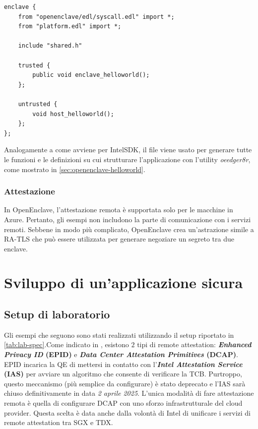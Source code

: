\documentclass{article}
\begin{document}
\begin{lstlisting}[caption=Esempio base di un file EDL,label=lst:base-edl]
enclave {
    from "openenclave/edl/syscall.edl" import *;
    from "platform.edl" import *;
     
    include "shared.h"

    trusted {
        public void enclave_helloworld();
    };

    untrusted {
        void host_helloworld();
    };
};
\end{lstlisting}

Analogamente a come avviene per IntelSDK, il file viene usato per generare tutte le funzioni e le definizioni su cui strutturare l'applicazione con l'utility \textit{oeedger8r}, come mostrato in \cref{sec:openenclave-helloworld}.

\subsubsection{Attestazione}
In OpenEnclave, l'attestazione remota è supportata solo per le macchine in Azure. Pertanto, gli esempi non includono la parte di comunicazione con i servizi remoti. Sebbene in modo più complicato, OpenEnclave crea un'astrazione simile a RA-TLS che può essere utilizzata per generare negoziare un segreto tra due enclave.

\clearpage
\section{Sviluppo di un'applicazione sicura}
\subsection{Setup di laboratorio}
Gli esempi che seguono sono stati realizzati utilizzando il setup riportato in \cref{tab:lab-spec}.Come indicato in , esistono $2$ tipi di remote attestation: \textbf{\textit{Enhanced Privacy ID} (EPID)} e \textbf{\textit{Data Center Attestation Primitives} (DCAP)}. EPID incarica la QE di mettersi in contatto con l'\textbf{\textit{Intel Attestation Service} (IAS)} per avviare un algoritmo che consente di verificare la TCB. Purtroppo, questo meccanismo (più semplice da configurare) è stato deprecato e l'IAS sarà chiuso definitivamente in data \textit{2 aprile 2025}. L'unica modalità di fare attestazione remota è quella di configurare DCAP con uno sforzo infrastrutturale del cloud provider. Questa scelta è data anche dalla volontà di Intel di unificare i servizi di remote attestation tra SGX e TDX.
\end{document}
